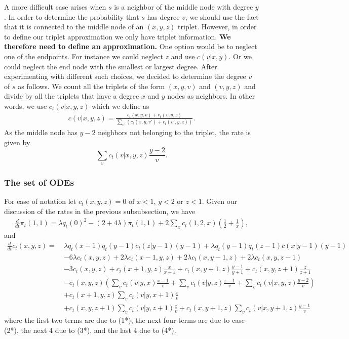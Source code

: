 \documentclass[acmsmall,nonacm]{acmart}
\begin{document}
A more difficult case arises when $s$ is a neighbor of the middle node with degree $y$. In order to determine the
probability that $s$ has degree $v$, we should use the fact that it is connected to the middle node of an $(x,y,z)$
triplet. However, in order to define our triplet approximation we only have triplet information.
{\bf We therefore need to define an approximation.} One option would
be to neglect one of the endpoints. For instance we could neglect $z$ and use $c(v|x,y)$. Or we could neglect
the end node with the smallest or largest degree. After experimenting with different such choices, we decided to 
determine the degree $v$ of $s$ as follows. We  count all the triplets of the form $(x,y,v)$ and $(v,y,z)$ and
divide by all the triplets that have a degree $x$ and $y$ nodes as neighbors. In other words, we use $c_t(v|x,y,z)$
which we define as
\begin{align}
    c(v|x,y,z) = \frac{c_t(x,y,v)+c_t(v,y,z)}{\sum_{v'} (c_t(x,y,v')+c_t(v',y,z)) }.
\end{align}
As the middle node has $y-2$ neighbors not belonging to the triplet, the rate is given by
\[ \sum_v c_t(v|x,y,z) \frac{y-2}{v}.\]

\subsubsection{The set of ODEs}
For ease of notation let $c_t(x,y,z)=0$ of $x<1$, $y<2$ or $z<1$.
Given our discussion of the rates in the previous subsubsection, we have
\begin{align}
    \label{eq:triplet_11}
    \frac{d}{dt} \pi_t(1,1) = \lambda q_t(0)^2 -(2+4\lambda) \pi_t(1,1)+  2 \sum_x c_t(1,2,x) \left( \frac{1}{2} + \frac{1}{x}\right),
\end{align}
and
\begin{align}\label{eq:ODE_triplet}
    \frac{d}{dt} c_t(x,y,z) = ~&\lambda q_t(x-1)q_t(y-1)c_t(z|y-1)(y-1) + \lambda q_t(y-1)q_t(z-1)c(x|y-1) (y-1) \nonumber\\
    & -6\lambda c_t(x,y,z) + 2\lambda c_t(x-1,y,z) + 2\lambda c_t(x,y-1,z) +2\lambda c_t(x,y,z-1)\nonumber \\
    &-3 c_t(x,y,z) + c_t(x+1,y,z)\frac{x}{x+1}+ c_t(x,y+1,z)\frac{y-1}{y+1} + c_t(x,y,z+1)\frac{z}{z+1} \nonumber\\
    &-c_t(x,y,z) \left( \sum_v c_t(v|y,x) \frac{x-1}{v} + \sum_v c_t(v|y,z) \frac{z-1}{v} + \sum_v c_t(v|x,y,z) \frac{y-2}{v} \right)\nonumber \\
    &+c_t(x+1,y,z) \sum_v c_t(v|y,x+1) \frac{x}{v}  
    \nonumber \\
    & +c_t(x,y,z+1) \sum_v c_t(v|y,z+1) \frac{z}{v}  +c_t(x,y+1,z) \sum_v c_t(v|x,y+1,z) \frac{y-1}{v} 
\end{align}
where the first two terms are due to (1*), the next four terms are due to case (2*), the next $4$ due to (3*), and the last $4$ due to (4*).
\end{document}
